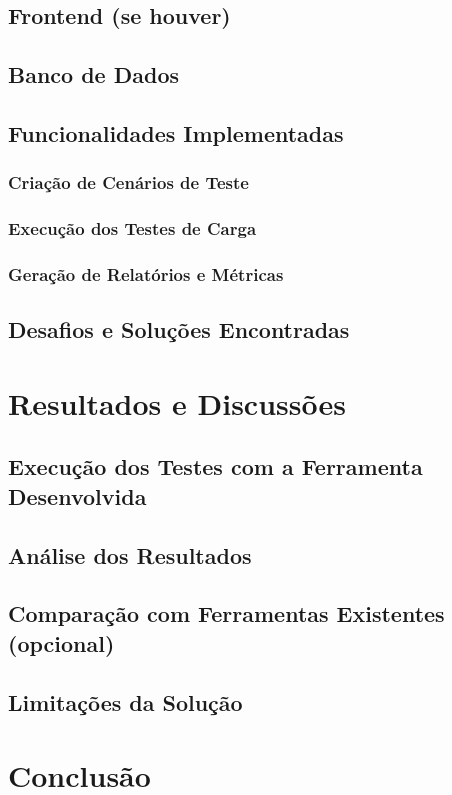\documentclass[a4paper,12pt]{article}
\begin{document}
\subsection{Frontend (se houver)}
\subsection{Banco de Dados}
\subsection{Funcionalidades Implementadas}
\subsubsection{Criação de Cenários de Teste}
\subsubsection{Execução dos Testes de Carga}
\subsubsection{Geração de Relatórios e Métricas}
\subsection{Desafios e Soluções Encontradas}

\section{Resultados e Discussões}
\subsection{Execução dos Testes com a Ferramenta Desenvolvida}
\subsection{Análise dos Resultados}
\subsection{Comparação com Ferramentas Existentes (opcional)}
\subsection{Limitações da Solução}

\section{Conclusão}
\end{document}
